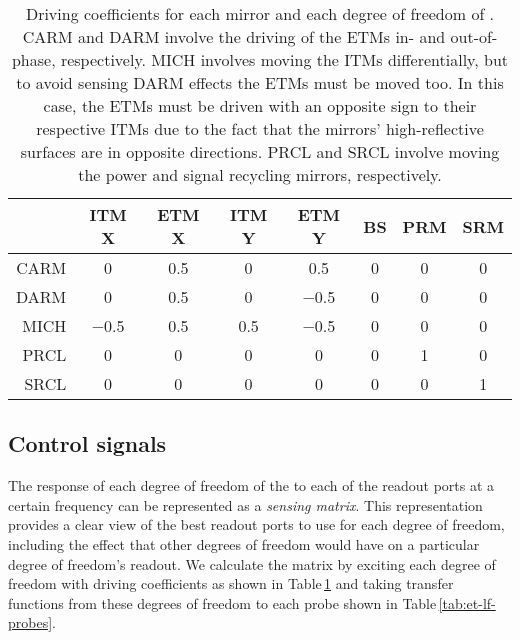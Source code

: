 \begin{table}
  \centering
  \begin{tabular}{r|ccccccc}
    & \textbf{\gls{ITM} X} & \textbf{\gls{ETM} X} & \textbf{\gls{ITM} Y} & \textbf{\gls{ETM} Y} & \textbf{\gls{BS}} & \textbf{\gls{PRM}} & \textbf{\gls{SRM}} \\
    \hline
    \gls{CARM} & \num{0} & \num{0.5} & \num{0} & \num{0.5} & \num{0} & \num{0} & \num{0} \\
    \gls{DARM} & \num{0} & \num{0.5} & \num{0} & \num{-0.5} & \num{0} & \num{0} & \num{0} \\
    \gls{MICH} & \num{-0.5} & \num{0.5} & \num{0.5} & \num{-0.5} & \num{0} & \num{0} & \num{0} \\
    \gls{PRCL} & \num{0} & \num{0} & \num{0} & \num{0} & \num{0} & \num{1} & \num{0} \\
    \gls{SRCL} & \num{0} & \num{0} & \num{0} & \num{0} & \num{0} & \num{0} & \num{1} \\
  \end{tabular}
  \caption[Driving coefficients for each mirror and each degree of freedom of \ETLF{}]{\label{tab:et-lf-driving-coefficients}Driving coefficients for each mirror and each degree of freedom of \ETLF{}. \gls{CARM} and \gls{DARM} involve the driving of the \glspl{ETM} in- and out-of-phase, respectively. \gls{MICH} involves moving the \glspl{ITM} differentially, but to avoid sensing \gls{DARM} effects the \glspl{ETM} must be moved too. In this case, the \glspl{ETM} must be driven with an opposite sign to their respective \glspl{ITM} due to the fact that the mirrors' high-reflective surfaces are in opposite directions. \gls{PRCL} and \gls{SRCL} involve moving the power and signal recycling mirrors, respectively.}
\end{table}

\subsection{Control signals}
The response of each degree of freedom of the \DRFPMI{} to each of the readout ports at a certain frequency can be represented as a \emph{sensing matrix}. This representation provides a clear view of the best readout ports to use for each degree of freedom, including the effect that other degrees of freedom would have on a particular degree of freedom's readout. We calculate the matrix by exciting each degree of freedom with driving coefficients as shown in Table\,\ref{tab:et-lf-driving-coefficients} and taking transfer functions from these degrees of freedom to each probe shown in Table\,\ref{tab:et-lf-probes}.


